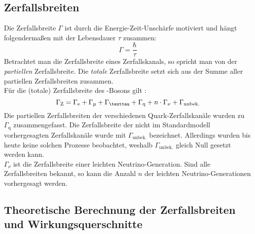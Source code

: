 \subsection{Zerfallsbreiten}
\label{sub:theo:gamma}
Die Zerfallsbreite $\Gamma$ ist durch die Energie-Zeit-Unschärfe motiviert und hängt folgendermaßen mit der Lebensdauer $\tau$ zusammen:
\begin{equation}
    \Gamma = \frac{\hbar}{\tau}
\end{equation}
Betrachtet man die Zerfallsbreite eines Zerfallskanals, so spricht man von der \emph{partiellen} Zerfallsbreite. Die \emph{totale} Zerfallsbreite
setzt sich aus der Summe aller partiellen Zerfallsbreiten zusammen. \\
Für die (totale) Zerfallsbreite des \Z-Bosons gilt \cite{manual}:
\begin{equation}
    \Gamma_\text{Z} = \Gamma_\text{e} + \Gamma_\text{\textmu} + \Gamma_\text{\texttau} + \Gamma_\text{q} + n \cdot \Gamma_\nu + \Gamma_\text{unbek.}
\end{equation}
Die partiellen Zerfallsbreiten der verschiedenen Quark-Zerfallskanäle wurden zu $\Gamma_\text{q}$ zusammengefasst. Die Zerfallsbreite der
nicht im Standardmodell vorhergesagten Zerfallskanäle wurde mit $\Gamma_\text{unbek.}$ bezeichnet. Allerdings wurden bis heute keine solchen
Prozesse beobachtet, weshalb $\Gamma_\text{unbek.}$ gleich Null gesetzt werden kann.\\
$\Gamma_\nu$ ist die Zerfallsbreite einer leichten Neutrino-Generation. Sind alle Zerfallsbreiten bekannt, so kann die Anzahl $n$ der leichten
Neutrino-Generationen vorhergesagt werden.

\subsection{Theoretische Berechnung der Zerfallsbreiten und Wirkungsquerschnitte}
